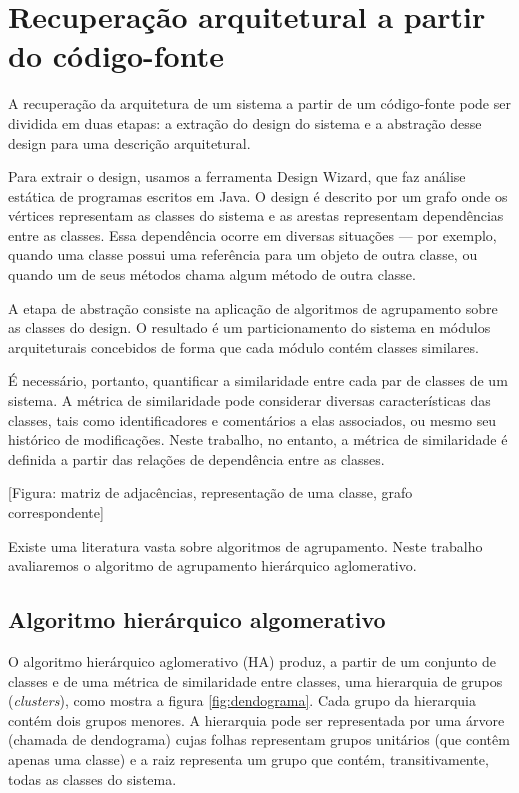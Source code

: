 \section{Recuperação arquitetural a partir do código-fonte}

A recuperação da arquitetura de um sistema a partir de um código-fonte pode
ser dividida em duas etapas: a extração do design do sistema e a abstração
desse design para uma descrição arquitetural.

Para extrair o design, usamos a ferramenta Design Wizard, que faz análise
estática de programas escritos em Java. O design é 
descrito por um grafo onde os vértices representam as classes do sistema
e as arestas representam dependências entre as classes. Essa dependência
ocorre em diversas situações --- por exemplo, quando uma classe possui uma
referência para um objeto de outra classe, ou quando um de seus métodos chama
algum método de outra classe.

A etapa de abstração consiste na aplicação de algoritmos de agrupamento sobre
as classes do design. O resultado é um particionamento do sistema en módulos
arquiteturais concebidos de forma que cada módulo contém classes similares.

É necessário, portanto, quantificar a similaridade entre cada par de classes
de um sistema. A métrica de similaridade pode considerar diversas 
características das classes, tais como identificadores e comentários a elas
associados, ou mesmo seu histórico de modificações.
Neste trabalho, no entanto, a métrica de similaridade é definida a partir
das relações de dependência entre as classes.

  [Figura: matriz de adjacências, representação de uma classe, grafo
  correspondente]

Existe uma literatura vasta sobre algoritmos de agrupamento. Neste trabalho
avaliaremos o algoritmo de agrupamento hierárquico aglomerativo.

\subsection{Algoritmo hierárquico algomerativo}

O algoritmo hierárquico aglomerativo (HA) produz, a partir de um conjunto
de classes e de uma métrica de similaridade entre classes, uma hierarquia
de grupos (\emph{clusters}), como mostra a figura \ref{fig:dendograma}. 
Cada grupo da hierarquia contém dois grupos menores.
A hierarquia pode ser
representada por uma árvore (chamada de dendograma) cujas folhas
representam grupos unitários (que contêm apenas uma classe) e a raiz
representa um grupo que contém, transitivamente, todas as classes do
sistema.

